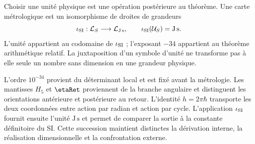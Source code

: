 Choisir une unité physique est une opération postérieure au théorème. Une carte métrologique est un isomorphisme de droites de grandeurs
\[
\iota_{\rm SI}:\mathcal L_S\longrightarrow\mathcal L_{\mathrm{J\,s}},
\qquad
\iota_{\rm SI}(\mathcal U_S)=\mathrm{J\,s}.
\]
L’unité appartient au codomaine de \(\iota_{\rm SI}\) ; l’exposant \(-34\) appartient au théorème arithmétique relatif. La juxtaposition d’un symbole d’unité ne transforme pas à elle seule un nombre sans dimension en une grandeur physique.

\begin{statusbox}[title={Hiérarchie probatoire de la constante de Planck}]
L’ordre \(10^{-34}\) provient du déterminant local et est fixé avant la métrologie. Les mantisses \(H_5\) et \(\etaRet\) proviennent de la branche angulaire et distinguent les orientations antérieure et postérieure au retour. L’identité \(h=2\pi\hbar\) transporte les deux coordonnées entre action par radian et action par cycle. L’application \(\iota_{\rm SI}\) fournit ensuite l’unité \(\mathrm{J\,s}\) et permet de comparer la sortie à la constante définitoire du SI. Cette succession maintient distinctes la dérivation interne, la réalisation dimensionnelle et la confrontation externe.
\end{statusbox}

